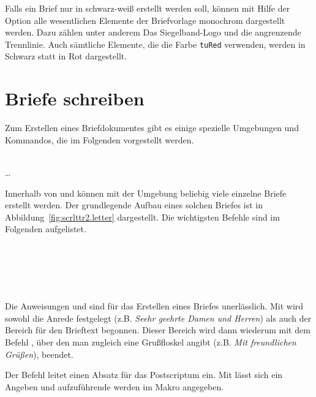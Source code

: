 Falls ein Brief nur in schwarz-weiß erstellt werden soll, können mit Hilfe
der Option  alle wesentlichen Elemente der Briefvorlage monochrom
dargestellt werden. Dazu zählen unter anderem Das Siegelband-Logo und die
angrenzende Trennlinie.
Auch sämtliche Elemente, die die Farbe \texttt{tuRed} verwenden, werden
in Schwarz statt in Rot dargestellt.

\section{Briefe schreiben}

Zum Erstellen eines Briefdokumentes gibt es einige spezielle Umgebungen und
Kommandos, die im Folgenden vorgestellt werden.

\begin{Declaration}
  \\
  \quad\dots\\
\end{Declaration}

Innerhalb von \lstinline!! und \lstinline!!
können mit der Umgebung  beliebig viele einzelne Briefe
erstellt werden. Der grundlegende Aufbau eines solchen Briefes ist in
Abbildung~\ref{fig:scrlttr2.letter} dargestellt. Die wichtigsten Befehle
sind im Folgenden aufgelistet.

\begin{Declaration}
  \\
  \\
  \\
  \\
\end{Declaration}

Die Anweisungen  und  sind für das Erstellen
eines Briefes unerlässlich. Mit  wird sowohl die Anrede
festgelegt (z.B. \textit{Seehr geehrte Damen und Herren}) als auch der
Bereich für den Brieftext begonnen.
Dieser Bereich wird dann wiederum mit dem Befehl , über den
man zugleich eine Grußfloskel angibt (z.B. \textit{Mit freundlichen Grüßen}),
beendet.

Der Befehl  leitet einen Absatz für das Postscriptum ein.
Mit  lässt sich ein  Angeben und
aufzuführende  werden im Makro  angegeben.

